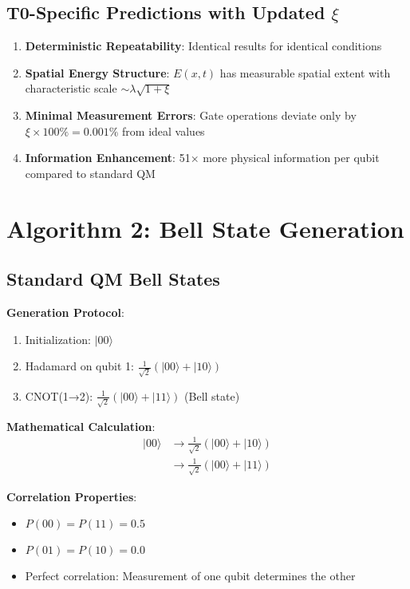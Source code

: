 \documentclass[12pt,a4paper]{article}
\newcommand{\Efield}{E}
\begin{document}
	\subsection{T0-Specific Predictions with Updated $\xi$}
	
	\begin{enumerate}
		\item \textbf{Deterministic Repeatability}: Identical results for identical conditions
		\item \textbf{Spatial Energy Structure}: $\Efield(x,t)$ has measurable spatial extent with characteristic scale $\sim \lambda \sqrt{1+\xi}$
		\item \textbf{Minimal Measurement Errors}: Gate operations deviate only by $\xi \times 100\% = 0.001\%$ from ideal values
		\item \textbf{Information Enhancement}: 51× more physical information per qubit compared to standard QM
	\end{enumerate}
	
	\section{Algorithm 2: Bell State Generation}
	
	\subsection{Standard QM Bell States}
	
	\textbf{Generation Protocol}:
	\begin{enumerate}
		\item Initialization: $|00\rangle$
		\item Hadamard on qubit 1: $\frac{1}{\sqrt{2}}(|00\rangle + |10\rangle)$
		\item CNOT(1→2): $\frac{1}{\sqrt{2}}(|00\rangle + |11\rangle)$ (Bell state)
	\end{enumerate}
	
	\textbf{Mathematical Calculation}:
	\begin{align}
		|00\rangle &\rightarrow \frac{1}{\sqrt{2}}(|00\rangle + |10\rangle) \\
		&\rightarrow \frac{1}{\sqrt{2}}(|00\rangle + |11\rangle)
	\end{align}
	
	\textbf{Correlation Properties}:
	\begin{itemize}
		\item $P(00) = P(11) = 0.5$
		\item $P(01) = P(10) = 0.0$
		\item Perfect correlation: Measurement of one qubit determines the other
	\end{itemize}
	
\end{document}
